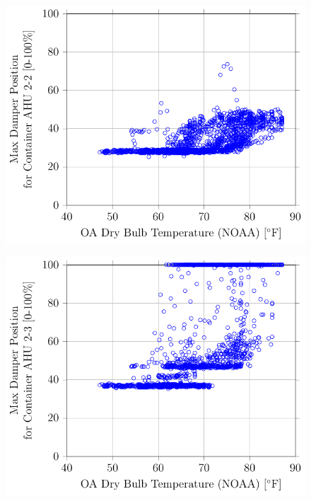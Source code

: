 \begin{figure}
\centering
\includegraphics{Plots/2016-06-06-1427-MaxDamperPositionforContainerAHU22vsOADryBulbTemperatureNOAA.pdf}
\caption{}
\label{fig:MaxDamperPositionforContainerAHU22vsOADryBulbTemperatureNOAA}
\end{figure}

\begin{figure}
\centering
\includegraphics[]{Plots/2016-06-06-1454-MaxDamperPositionforContainerAHU23vsOADryBulbTemperatureNOAA.pdf}
\caption{}
\label{fig:MaxDamperPositionforContainerAHU23vsOADryBulbTemperatureNOAA}
\end{figure}


